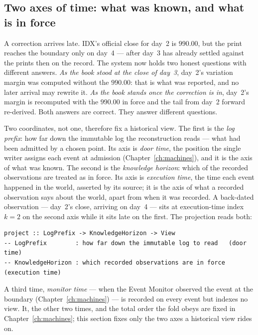 \documentclass[11pt,a4paper]{article}
\begin{document}
\subsection{Two axes of time: what was known, and what is in force}\label{sec:bitemporal}

A correction arrives late. IDX's official close for day~2 is $990.00$, but the print
reaches the boundary only on day~4 --- after day~3 has already settled against the
prints then on the record. The system now holds two honest questions with different
answers. \emph{As the book stood at the close of day~3}, day~2's variation margin was
computed without the $990.00$: that is what was reported, and no later arrival may rewrite
it. \emph{As the book stands once the correction is in}, day~2's margin is recomputed with
the $990.00$ in force and the tail from day~2 forward re-derived. Both answers are correct.
They answer different questions.

Two coordinates, not one, therefore fix a historical view. The first is the \emph{log
prefix}: how far down the immutable log the reconstruction reads --- what had been admitted
by a chosen point. Its axis is \emph{door time}, the position the single writer assigns each
event at admission (Chapter~\ref{ch:machines}), and it is the axis of what was known. The
second is the \emph{knowledge horizon}: which of the recorded observations are treated as in
force. Its axis is \emph{execution time}, the time each event happened in the world, asserted
by its source; it is the axis of what a recorded observation says about the world, apart from
when it was recorded. A back-dated observation --- day~2's close, arriving on day~4 --- sits
at execution-time index $k=2$ on the second axis while it sits late on the first. The
projection reads both:

\begin{lstlisting}
project :: LogPrefix -> KnowledgeHorizon -> View
-- LogPrefix        : how far down the immutable log to read   (door time)
-- KnowledgeHorizon : which recorded observations are in force (execution time)
\end{lstlisting}

A third time, \emph{monitor time} --- when the Event Monitor observed the event at the
boundary (Chapter~\ref{ch:machines}) --- is recorded on every event but indexes no view. It,
the other two times, and the total order the fold obeys are fixed in Chapter~\ref{ch:machines};
this section fixes only the two axes a historical view rides on.
\end{document}
